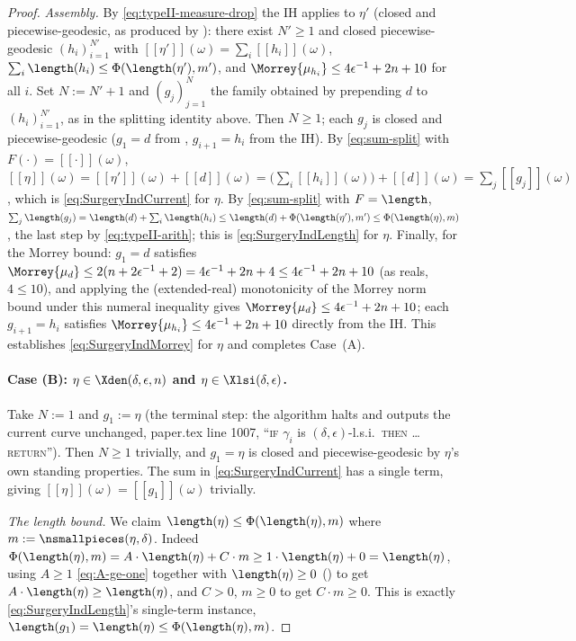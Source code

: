 \begin{proof}
  \emph{Assembly.} By \eqref{eq:typeII-measure-drop} the IH applies to $\eta'$ (closed and
  piecewise-geodesic, as produced by ): there exist $N'\ge1$ and closed
  piecewise-geodesic $(h_i)_{i=1}^{N'}$ with $[[\eta']](\omega)=\sum_i[[h_i]](\omega)$,
  $\sum_i\length(h_i)\le\Phi(\length(\eta'),m')$, and $\Morrey{\mu_{h_i}}\le4\epsilon^{-1}+2n+10$
  for all $i$. Set $N:=N'+1$ and $(g_j)_{j=1}^N$ the family obtained by prepending $d$ to
  $(h_i)_{i=1}^{N'}$, as in the splitting identity above. Then $N\ge1$; each $g_j$ is closed and
  piecewise-geodesic ($g_1=d$ from , $g_{i+1}=h_i$ from the IH). By
  \eqref{eq:sum-split} with $F(\cdot)=[[\cdot]](\omega)$, $[[\eta]](\omega) = [[\eta']](\omega)+
  [[d]](\omega) = \bigl(\sum_i[[h_i]](\omega)\bigr)+[[d]](\omega) = \sum_j[[g_j]](\omega)$, which is
  \eqref{eq:SurgeryIndCurrent} for $\eta$. By \eqref{eq:sum-split} with $F=\length$,
  $\sum_j\length(g_j) = \length(d)+\sum_i\length(h_i) \le \length(d)+\Phi(\length(\eta'),m') \le
  \Phi(\length(\eta),m)$, the last step by \eqref{eq:typeII-arith}; this is
  \eqref{eq:SurgeryIndLength} for $\eta$. Finally, for the Morrey bound: $g_1=d$ satisfies
  $\Morrey{\mu_d}\le2(n+2\epsilon^{-1}+2) = 4\epsilon^{-1}+2n+4 \le 4\epsilon^{-1}+2n+10$ (as reals,
  $4\le10$), and applying the (extended-real) monotonicity of the Morrey norm bound under this
  numeral inequality gives $\Morrey{\mu_d}\le4\epsilon^{-1}+2n+10$; each $g_{i+1}=h_i$ satisfies
  $\Morrey{\mu_{h_i}}\le4\epsilon^{-1}+2n+10$ directly from the IH. This establishes
  \eqref{eq:SurgeryIndMorrey} for $\eta$ and completes Case~(A).

  \paragraph{Case (B): $\eta\in\Xden(\delta,\epsilon,n)$ and $\eta\in\Xlsi(\delta,\epsilon)$.} Take
  $N:=1$ and $g_1:=\eta$ (the terminal step: the algorithm halts and outputs the current curve
  unchanged, paper.tex line 1007, ``\textsc{if} $\gamma_i$ is $(\delta,\epsilon)$-l.s.i.\
  \textsc{then} \ldots \textsc{return}''). Then $N\ge1$ trivially, and $g_1=\eta$ is closed and
  piecewise-geodesic by $\eta$'s own standing properties. The sum in
  \eqref{eq:SurgeryIndCurrent} has a single term, giving $[[\eta]](\omega)=[[g_1]](\omega)$
  trivially.

  \emph{The length bound.} We claim $\length(\eta) \le
  \Phi(\length(\eta),m)$ where $m:=\nsmallpieces(\eta,\delta)$. Indeed $\Phi(\length(\eta),m) = A
  \cdot\length(\eta)+C\cdot m \ge 1\cdot\length(\eta)+0 = \length(\eta)$, using $A\ge1$
  \eqref{eq:A-ge-one} together with $\length(\eta)\ge0$ (\noderef{Curve}) to get $A\cdot\length(\eta)
  \ge\length(\eta)$, and $C>0$, $m\ge0$ to get $C\cdot m\ge0$. This is exactly
  \eqref{eq:SurgeryIndLength}'s single-term instance, $\length(g_1)=\length(\eta) \le
  \Phi(\length(\eta),m)$.


\end{proof}
